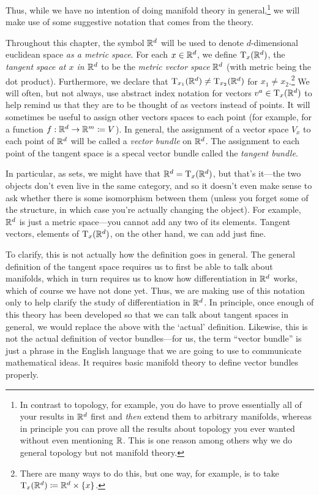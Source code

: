 Thus, while we have no intention of doing manifold theory in general,\footnote{In contrast to topology, for example, you do have to prove essentially all of your results in $\mathbb{R} ^d$ first and \emph{then} extend them to arbitrary manifolds, whereas in principle you can prove all the results about topology you ever wanted without even mentioning $\mathbb{R}$.  This is one reason among others why we do general topology but not manifold theory.} we will make use of some suggestive notation that comes from the theory.
\begin{displayquote}
Throughout this chapter, the symbol $\mathbb{R} ^d$ will be used to denote $d$-dimensional euclidean space \emph{as a metric space}.  For each $x\in \mathbb{R} ^d$, we define $\tangent[\R ^d][x]$, the \emph{tangent space at $x$ in $\mathbb{R} ^d$} to be the \emph{metric vector space} $\mathbb{R} ^d$ (with metric being the dot product).  Furthermore, we declare that $\tangent[\R ^d][x_1]\neq \tangent[\R ^d][x_2]$ for $x_1\neq x_2$.\footnote{There are many ways to do this, but one way, for example, is to take $\tangent[\R ^d][x]\coloneqq \R ^d\times \{ x\}$.}  We will often, but not always, use abstract index notation for vectors $v^a\in \tangent[\R ^d][x]$ to help remind us that they are to be thought of as vectors instead of points.  It will sometimes be useful to assign other vectors spaces to each point (for example, for a function $f:\mathbb{R} ^d\rightarrow \mathbb{R} ^m\coloneqq V$).  In general, the assignment of a vector space $V_x$ to each point of $\mathbb{R} ^d$ will be called a \emph{vector bundle} on $\mathbb{R} ^d$.  The assignment to each point of the tangent space is a specal vector bundle called the \emph{tangent bundle}.
\end{displayquote}
In particular, as sets, we might have that $\R ^d=\tangent[\R ^d][x]$, but that's it---the two objects don't even live in the same category, and so it doesn't even make sense to ask whether there is some isomorphism between them (unless you forget some of the structure, in which case you're actually changing the object).  For example, $\mathbb{R} ^d$ is just a metric space---you cannot add any two of its elements.  Tangent vectors, elements of $\tangent[\R ^d][x]$, on the other hand, we can add just fine.

To clarify, this is not actually how the definition goes in general.  The general definition of the tangent space requires us to first be able to talk about manifolds, which in turn requires us to know how differentiation in $\mathbb{R} ^d$ works, which of course we have not done yet.  Thus, we are making use of this notation only to help clarify the study of differentiation in $\mathbb{R} ^d$.  In principle, once enough of this theory has been developed so that we can talk about tangent spaces in general, we would replace the above with the `actual' definition.  Likewise, this is not the actual definition of vector bundles---for us, the term ``vector bundle'' is just a phrase in the English language that we are going to use to communicate mathematical ideas.  It requires basic manifold theory to define vector bundles properly.

